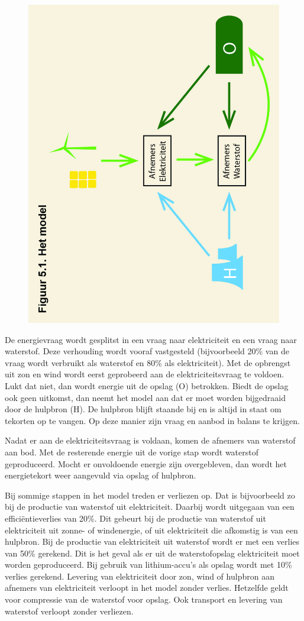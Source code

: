 \documentclass[
  11pt,
  a4paper,
]{book}
\begin{document}
\begin{figure}[H]

{\centering \includegraphics[width=0.7\linewidth,height=0.7\textheight]{Model energiemix eenvoudig} 

}

\end{figure}

De energievraag wordt gesplitst in een vraag naar elektriciteit en een vraag naar waterstof. Deze verhouding wordt vooraf vastgesteld (bijvoorbeeld 20\% van de vraag wordt verbruikt als waterstof en 80\% als elektriciteit). Met de opbrengst uit zon en wind wordt eerst geprobeerd aan de elektriciteitsvraag te voldoen. Lukt dat niet, dan wordt energie uit de opslag (O) betrokken. Biedt de opslag ook geen uitkomst, dan neemt het model aan dat er moet worden bijgedraaid door de hulpbron (H). De hulpbron blijft staande bij en is altijd in staat om tekorten op te vangen. Op deze manier zijn vraag en aanbod in balans te krijgen.

Nadat er aan de elektriciteitsvraag is voldaan, komen de afnemers van waterstof aan bod. Met de resterende energie uit de vorige stap wordt waterstof geproduceerd. Mocht er onvoldoende energie zijn overgebleven, dan wordt het energietekort weer aangevuld via opslag of hulpbron.

Bij sommige stappen in het model treden er verliezen op. Dat is bijvoorbeeld zo bij de productie van waterstof uit elektriciteit. Daarbij wordt uitgegaan van een efficiëntieverlies van 20\%. Dit gebeurt bij de productie van waterstof uit elektriciteit uit zonne- of windenergie, of uit elektriciteit die afkomstig is van een hulpbron. Bij de productie van elektriciteit uit waterstof wordt er met een verlies van 50\% gerekend. Dit is het geval als er uit de waterstofopslag elektriciteit moet worden geproduceerd. Bij gebruik van lithium-accu's als opslag wordt met 10\% verlies gerekend. Levering van elektriciteit door zon, wind of hulpbron aan afnemers van elektriciteit verloopt in het model zonder verlies. Hetzelfde geldt voor compressie van de waterstof voor opslag. Ook transport en levering van waterstof verloopt zonder verliezen.
\end{document}
